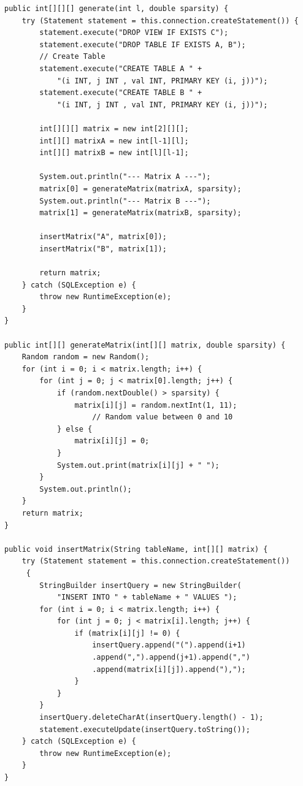 \documentclass[11pt]{scrartcl}
\begin{document}
\begin{lstlisting}[style=dmrJava]
public int[][][] generate(int l, double sparsity) {
    try (Statement statement = this.connection.createStatement()) {
        statement.execute("DROP VIEW IF EXISTS C");
        statement.execute("DROP TABLE IF EXISTS A, B");
        // Create Table
        statement.execute("CREATE TABLE A " + 
            "(i INT, j INT , val INT, PRIMARY KEY (i, j))");
        statement.execute("CREATE TABLE B " + 
            "(i INT, j INT , val INT, PRIMARY KEY (i, j))");

        int[][][] matrix = new int[2][][];
        int[][] matrixA = new int[l-1][l];
        int[][] matrixB = new int[l][l-1];
            
        System.out.println("--- Matrix A ---");
        matrix[0] = generateMatrix(matrixA, sparsity);
        System.out.println("--- Matrix B ---");
        matrix[1] = generateMatrix(matrixB, sparsity);

        insertMatrix("A", matrix[0]);
        insertMatrix("B", matrix[1]);

        return matrix;
    } catch (SQLException e) {
        throw new RuntimeException(e);
    }
}

public int[][] generateMatrix(int[][] matrix, double sparsity) {
    Random random = new Random();
    for (int i = 0; i < matrix.length; i++) {
        for (int j = 0; j < matrix[0].length; j++) {
            if (random.nextDouble() > sparsity) {
                matrix[i][j] = random.nextInt(1, 11); 
                    // Random value between 0 and 10
            } else {
                matrix[i][j] = 0;
            }
            System.out.print(matrix[i][j] + " ");
        }
        System.out.println();
    }
    return matrix;
}

public void insertMatrix(String tableName, int[][] matrix) {
    try (Statement statement = this.connection.createStatement())
     {
        StringBuilder insertQuery = new StringBuilder(
            "INSERT INTO " + tableName + " VALUES ");
        for (int i = 0; i < matrix.length; i++) {
            for (int j = 0; j < matrix[i].length; j++) {
                if (matrix[i][j] != 0) {
                    insertQuery.append("(").append(i+1)
                    .append(",").append(j+1).append(",")
                    .append(matrix[i][j]).append("),");
                }
            }
        }
        insertQuery.deleteCharAt(insertQuery.length() - 1);
        statement.executeUpdate(insertQuery.toString());
    } catch (SQLException e) {
        throw new RuntimeException(e);
    }
}
\end{lstlisting}
\end{document}
